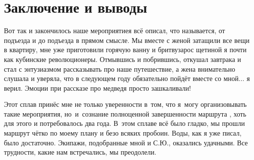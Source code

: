 \chapter{Заключение и выводы} 
\vepsianrose

Вот так и закончилось наше мероприятие\mdash я всё описал, что называется, от подъезда и до подъезда в прямом смысле. Мы вместе с женой затащили все вещи в квартиру, мне уже приготовили горячую ванну и бритву\mdash зарос щетиной я почти как кубинские революционеры. Отмывшись и побрившись, откушал завтрака и стал с энтузиазмом рассказывать про наше путешествие, а жена внимательно слушала и уверяла, что в следующем году обязательно пойдёт вместе со мной$\ldots$ я верил. Эмоции при рассказе про медведя просто зашкаливали!

Этот сплав принёс мне не только уверенности в~том, что я~могу организовывать такие мероприятия, но~и~сознание полноценной завершенности маршрута , хоть для этого и потребовалось два года. В~этом сплаве всё было гладко, мы прошли маршрут чётко по моему плану и безо всяких пробоин. Воды, как я уже писал, было достаточно. Экипажи, подобранные мной и С.Ю., оказались удачными. Все трудности, какие нам встречались, мы преодолели.

